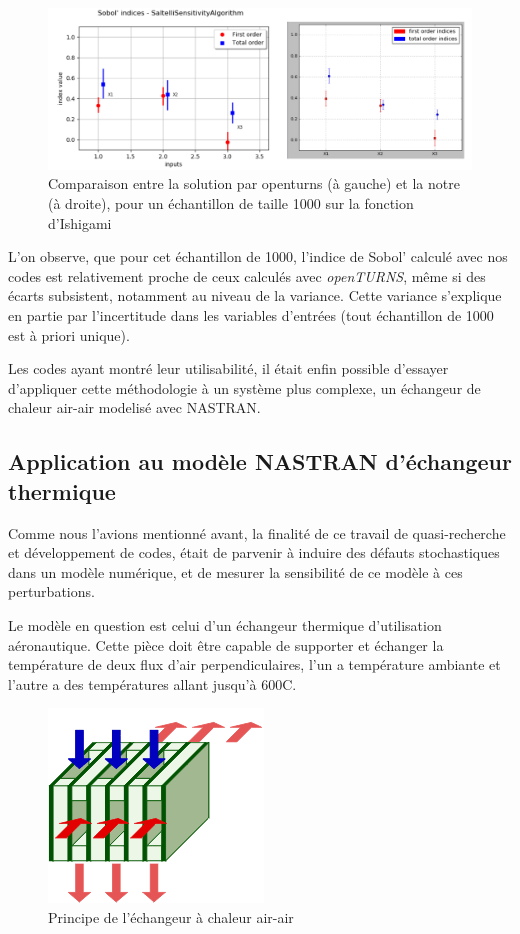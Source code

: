\documentclass[a4paper,10pt]{article}
\begin{document}
\begin{figure}[H]
   \centering   
   \includegraphics[scale=0.255]{comparisonOtMe.png}
      \caption{Comparaison entre la solution par openturns (à gauche) et la notre (à droite), pour un échantillon de taille 1000 sur la fonction d'Ishigami}
         \label{Comparison}
\end{figure}

L'on observe, que pour cet échantillon de 1000, l'indice de Sobol' calculé avec nos codes est relativement proche de ceux calculés avec \textit{openTURNS}, même si des écarts subsistent, notamment au niveau de la variance. Cette variance s'explique en partie par l'incertitude dans les variables d'entrées (tout échantillon de 1000 est à priori unique).

Les codes ayant montré leur utilisabilité, il était enfin possible d'essayer d'appliquer cette méthodologie à un système plus complexe, un échangeur de chaleur air-air modelisé avec NASTRAN. 
 
\subsection{Application au modèle NASTRAN d'échangeur thermique}

Comme nous l'avions mentionné avant, la finalité de ce travail de quasi-recherche et développement de codes, était de parvenir à induire des défauts stochastiques dans un modèle numérique, et de mesurer la sensibilité de ce modèle à ces perturbations. 

Le modèle en question est celui d'un échangeur thermique d'utilisation aéronautique. Cette pièce doit être  capable de supporter et échanger la température de deux flux d'air perpendiculaires, l'un a température ambiante et l'autre a des températures allant jusqu'à 600C. \\

\begin{figure}[H]
   \centering   
   \includegraphics[scale=0.5]{principeEchangeur.png}
      \caption{Principe de l'échangeur à chaleur air-air}
         \label{principleExchanger}
\end{figure}
\end{document}
